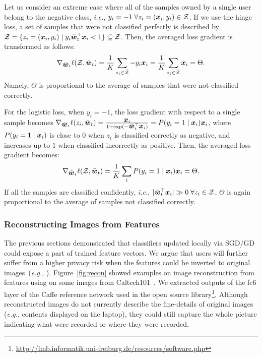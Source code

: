 \documentclass[10pt,twocolumn,letterpaper]{article}
\def\vct#1{\mbox{\boldmath $#1$}}
\def\eg{{\it e.g.}}
\def\ie{{\it i.e.}}
\def\barw{\bar{\vct{w}}}
\begin{document}
Let us consider an extreme case where all of the samples owned by a single user belong to the negative class, \ie, $y_i=-1\;\forall z_i=(\vct{x}_i, y_i) \in \mathcal{Z}$. If we use the hinge loss, a set of samples that were not classified perfectly is described by $\bar{\mathcal{Z}}=\{z_i=(\vct{x}_i,y_i)\mid y_i\barw_t^\top\vct{x}_i<1\}\subseteq \mathcal{Z}$. Then, the averaged loss gradient is transformed as follows:
\begin{equation}
\nabla_{\barw_t}\ell(\mathcal{Z}, \barw_t)= \frac{1}{K}\sum_{z_i\in\bar{\mathcal{Z}}} -y_i\vct{x}_i=\frac{1}{K}\sum_{z_i\in\bar{\mathcal{Z}}}\vct{x}_i=\Theta.
\end{equation}
Namely, $\Theta$ is proportional to the average of samples that were not classified correctly.

For the logistic loss, when $y_i=-1$, the loss gradient with respect to a single sample becomes $\nabla_{\barw_t}\ell(z_i, \barw_t) = \frac{\vct{x}_i}{1 + \exp(-\barw_t^\top\vct{x}_i)}=P(y_i=1\mid \vct{x}_i)\vct{x}_i$, where $P(y_i=1\mid\vct{x}_i)$ is close to $0$ when $z_i$ is classified correctly as negative, and increases up to $1$ when classified incorrectly as positive. Then, the averaged loss gradient becomes:
\begin{equation}
\nabla_{\barw_t}\ell(\mathcal{Z}, \barw_t)=\frac{1}{K}\sum_{i}P(y_i=1\mid\vct{x}_i)\vct{x}_i=\Theta.
\end{equation}
If all the samples are classified confidently, \ie, $|\barw_t^\top\vct{x}_i| \gg 0 \; \forall z_i\in\mathcal{Z}$, $\Theta$ is again proportional to the average of samples not classified correctly.

\subsubsection{Reconstructing Images from Features}
The previous sections demonstrated that classifiers updated locally via SGD/GD could expose a part of trained feature vectors. We argue that users will further suffer from a higher privacy risk when the features could be inverted to original images~(\eg, \cite{Dosovitskiy2016a,Mahendran2015,Vondrick2013a}).  Figure~\ref{fig:recon} showed examples on image reconstruction from features using \cite{Dosovitskiy2016a} on some images from Caltech101~\cite{Fei-Fei2007a}. We extracted outputs of the fc6 layer of the Caffe reference network used in the open source library\footnote{\url{http://lmb.informatik.uni-freiburg.de/resources/software.php}}. Although reconstructed images do not currently describe the fine-details of original images (\eg, contents displayed on the laptop), they could still capture the whole picture indicating what were recorded or where they were recorded.
\end{document}
